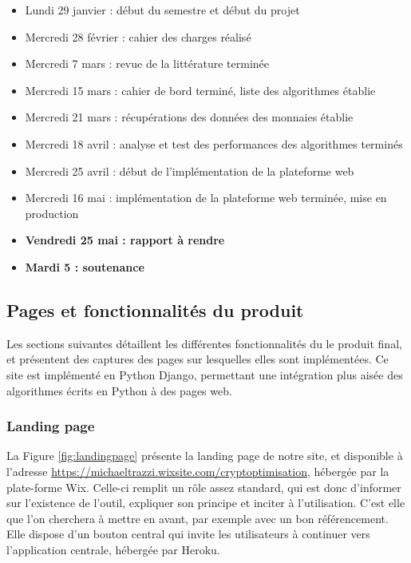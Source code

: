 \documentclass[a4paper, 10pt]{article}
\begin{document}
\begin{itemize}
    \item Lundi 29 janvier : début du semestre et début du projet
    \item Mercredi 28 février : cahier des charges réalisé
    \item Mercredi 7 mars : revue de la littérature terminée
    \item Mercredi 15 mars : cahier de bord terminé, liste des algorithmes établie
    \item Mercredi 21 mars : récupérations des données des monnaies établie
    \item Mercredi 18 avril : analyse et test des performances des algorithmes terminés
    \item Mercredi 25 avril : début de l'implémentation de la plateforme web
    \item Mercredi 16 mai : implémentation de la plateforme web terminée, mise en production
    \item \textbf{Vendredi 25 mai : rapport à rendre}
    \item \textbf{Mardi 5 : soutenance}
\end{itemize}

\subsection{Pages et fonctionnalités du produit}
\label{sec:developpement_pages}

Les sections suivantes détaillent les différentes fonctionnalités du le produit final, et présentent des captures des pages sur lesquelles elles sont implémentées. Ce site est implémenté en Python Django, permettant une intégration plus aisée des algorithmes écrits en Python à des pages web.

\subsubsection{Landing page}
\label{sec:developpement_pages_landing}

La Figure \ref{fig:landingpage} présente la landing page de notre site, et disponible à l'adresse \url{https://michaeltrazzi.wixsite.com/cryptoptimisation}, hébergée par la plate-forme Wix. Celle-ci remplit un rôle assez standard, qui est donc d'informer sur l'existence de l'outil, expliquer son principe et inciter à l'utilisation. C'est elle que l'on cherchera à mettre en avant, par exemple avec un bon référencement. Elle dispose d'un bouton central qui invite les utilisateurs à continuer vers l'application centrale, hébergée par Heroku.
\end{document}
